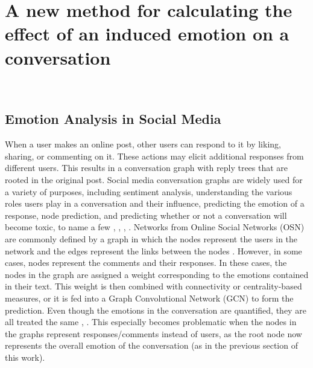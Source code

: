 \section{A new method for calculating the effect of an induced emotion on a conversation}~\label{sec:approach}
\subsection{Emotion Analysis in Social Media}
When a user makes an online post, other users can respond to it by liking, sharing, or commenting on it. These actions may elicit additional responses from different users. This results in a conversation graph with reply trees that are rooted in the original post. 
Social media conversation graphs are widely used for a variety of purposes, including sentiment analysis, understanding the various roles users play in a conversation and their influence, predicting the emotion of a response, node prediction, and predicting whether or not a conversation will become toxic, to name a few \cite{yang2022implicit}, \cite{zhao2020modeling}, \cite{yang2017social}, \cite{brambilla2021conversation}. Networks from Online Social Networks (OSN) are commonly defined by a graph in which the nodes represent the users in the network and the edges represent the links between the nodes \cite{antonakaki2021survey}. However, in some cases, nodes represent the comments and their responses. In these cases, the nodes in the graph are assigned a weight corresponding to the emotions contained in their text. This weight is then combined with connectivity or centrality-based measures, or it is fed into a Graph Convolutional Network (GCN) to form the prediction. Even though the emotions in the conversation are quantified, they are all treated the same \cite{perikos2018framework}, \cite{albadani2022transformer}. This especially becomes problematic when the nodes in the graphs represent responses/comments instead of users, as the root node now represents the overall emotion of the conversation (as in the previous section of this work). 
 

